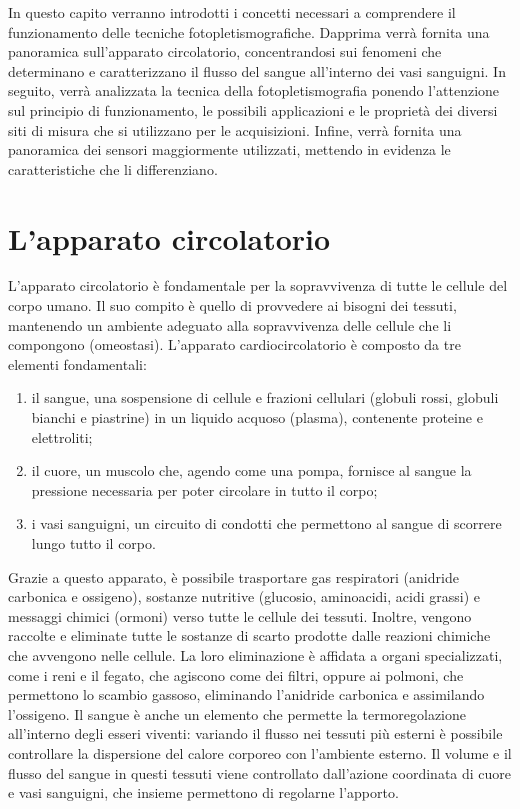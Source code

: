 In questo capito verranno introdotti i concetti necessari a comprendere il funzionamento delle tecniche fotopletismografiche. Dapprima verrà fornita una panoramica sull'apparato circolatorio, concentrandosi sui fenomeni che determinano e caratterizzano il flusso del sangue all'interno dei vasi sanguigni. In seguito, verrà analizzata la tecnica della fotopletismografia ponendo l'attenzione sul principio di funzionamento, le possibili applicazioni e le proprietà dei diversi siti di misura che si utilizzano per le acquisizioni. Infine, verrà fornita una panoramica dei sensori maggiormente utilizzati, mettendo in evidenza le caratteristiche che li differenziano.
\section{L'apparato circolatorio}
L'apparato circolatorio è fondamentale per la sopravvivenza di tutte le cellule del corpo umano. Il suo compito è quello di provvedere ai bisogni dei tessuti, mantenendo un ambiente adeguato alla sopravvivenza delle cellule che li compongono (omeostasi)\cite{Cevese2002}. 
L'apparato cardiocircolatorio è composto da tre elementi fondamentali:
\begin{enumerate}
\item il sangue, una sospensione di cellule e frazioni cellulari (globuli rossi, globuli bianchi e piastrine) in un liquido acquoso (plasma), contenente proteine e elettroliti;
\item il cuore, un muscolo che, agendo come una pompa, fornisce al sangue la pressione necessaria per poter circolare in tutto il corpo;
\item i vasi sanguigni, un circuito di condotti che permettono al sangue di scorrere lungo tutto il corpo.
\end{enumerate}
Grazie a questo apparato, è possibile trasportare gas respiratori (anidride carbonica e ossigeno), sostanze nutritive (glucosio, aminoacidi, acidi grassi) e messaggi chimici (ormoni) verso tutte le cellule dei tessuti. Inoltre, vengono raccolte e eliminate tutte le sostanze di scarto prodotte  dalle reazioni chimiche che avvengono nelle cellule. La loro eliminazione è affidata a organi specializzati, come i reni e il fegato, che agiscono come dei filtri, oppure ai polmoni, che permettono lo scambio gassoso, eliminando l'anidride carbonica e assimilando l'ossigeno. Il sangue è anche un elemento che permette la termoregolazione all'interno degli esseri viventi: variando il flusso nei tessuti più esterni è possibile controllare la dispersione del calore corporeo con l'ambiente esterno. Il volume e il flusso del sangue in questi tessuti viene controllato dall'azione coordinata di cuore e vasi sanguigni, che insieme permettono di regolarne l'apporto.

